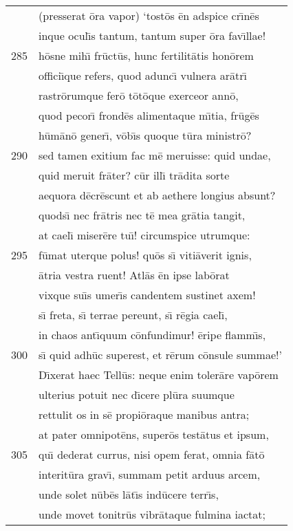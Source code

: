 \documentclass[paper=6in:9in,pagesize=pdftex,
               headinclude=on,footinclude=on,12pt]{scrbook}
\begin{document}
\begin{longtable}[p]{ r l }
 & (presserat \=ora vapor) `tost\=os \=en adspice cr\={\i}n\=es\\ 
 & inque ocul\={\i}s tantum, tantum super \=ora fav\={\i}llae!\\ 
285 & h\=osne mih\={\i} fr\=uct\=us, hunc fertilit\=atis hon\=orem\\ 
 & offici\={\i}que refers, quod adunc\={\i} vulnera ar\=atr\={\i}\\ 
 & rastr\=orumque fer\=o t\=ot\=oque exerceor ann\=o,\\ 
 & quod pecor\={\i} frond\=es alimentaque m\={\i}tia, fr\=ug\=es\\ 
 & h\=um\=an\=o gener\={\i}, v\=ob\={\i}s quoque t\=ura ministr\=o?\\ 
290 & sed tamen exitium fac m\=e meruisse: quid undae,\\ 
 & quid meruit fr\=ater? c\=ur ill\={\i} tr\=adita sorte\\ 
 & aequora d\=ecr\=escunt et ab aethere longius absunt?\\ 
 & quods\={\i} nec fr\=atris nec t\=e mea gr\=atia tangit,\\ 
 & at cael\={\i} miser\=ere tu\={\i}! circumspice utrumque:\\ 
295 & f\=umat uterque polus! qu\=os s\={\i} viti\=averit ignis,\\ 
 & \=atria vestra ruent! Atl\=as \=en ipse lab\=orat\\ 
 & vixque su\={\i}s umer\={\i}s candentem sustinet axem!\\ 
 & s\={\i} freta, s\={\i} terrae pereunt, s\={\i} r\=egia cael\={\i},\\ 
 & in chaos ant\={\i}quum c\=onfundimur! \=eripe flamm\={\i}s,\\ 
300 & s\={\i} quid adh\=uc superest, et r\=erum c\=onsule summae!'\\ 
 & \indent D\={\i}xerat haec Tell\=us: neque enim toler\=are vap\=orem\\ 
 & ulterius potuit nec d\={\i}cere pl\=ura suumque\\ 
 & rettulit os in s\=e propi\=oraque manibus antra;\\ 
 & at pater omnipot\=ens, super\=os test\=atus et ipsum,\\ 
305 & qu\={\i} dederat currus, nisi opem ferat, omnia f\=at\=o\\ 
 & interit\=ura grav\={\i}, summam petit arduus arcem,\\ 
 & unde solet n\=ub\=es l\=at\={\i}s ind\=ucere terr\={\i}s,\\ 
 & unde movet tonitr\=us vibr\=ataque fulmina iactat;\\ 

\end{longtable}
\end{document}
